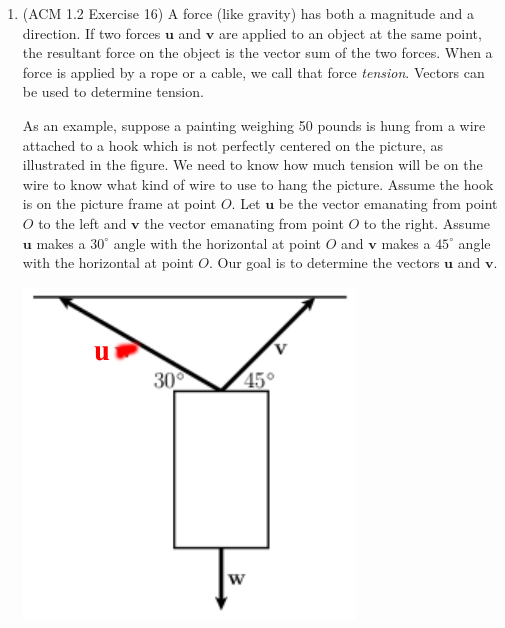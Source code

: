 \documentclass[10pt]{article}
\newcommand{\vu}{\mathbf{u}}
\newcommand{\vv}{\mathbf{v}}
\begin{document}
\begin{enumerate}[leftmargin=0pt]
\begin{enumerate}
{        (In other words that are more practical: if we're offered a lower interest rate and we want to keep our payments the same, then we can pay off the loan in a shorter duration.)}
    \end{enumerate}
    \item 
    \begin{minipage}[t]{0.5\linewidth}
    (ACM 1.2 Exercise 16)
    A force (like gravity) has both a magnitude and a direction. If two forces $\vu$ and $\vv$ are applied to an object at the same point, the resultant force on the object is the vector sum of the two forces. When a force is applied by a rope or a cable, we call that force \textit{tension}. Vectors can be used to determine tension.
    
    As an example, suppose a painting weighing 50 pounds is hung from a wire attached to a hook which is not perfectly centered on the picture, as illustrated in the figure. We need to know how much tension will be on the wire to know what kind of wire to use to hang the picture. Assume the hook is on the picture frame at point $O$. Let $\vu$ be the vector emanating from point $O$ to the left and $\vv$ the vector emanating from point $O$ to the right. Assume $\vu$ makes a $30^\circ$ angle with the horizontal at point $O$ and $\vv$ makes a $45^\circ$ angle with the horizontal at point $O$. Our goal is to determine the vectors $\vu$ and $\vv$.
    \end{minipage}
    \hspace{0.1in}
    \begin{minipage}[t]{0.4\linewidth}
    \vspace{0pt}
    \includegraphics[width=\linewidth]{fig_9_2_forces.pdf}

\end{minipage}
\end{enumerate}
\end{document}
